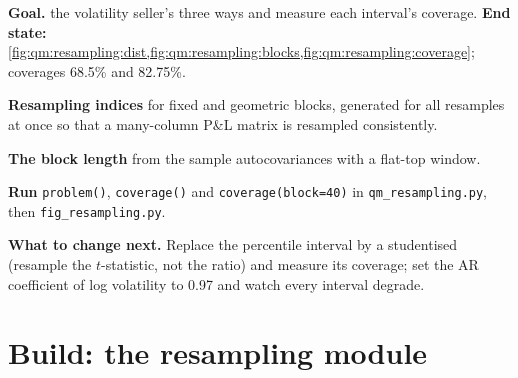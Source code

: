 \begin{tutorial}
\textbf{Goal.}  the volatility seller's  three ways and measure each interval's coverage.
\textbf{End state:} \cref{fig:qm:resampling:dist,fig:qm:resampling:blocks,fig:qm:resampling:coverage}; coverages 68.5\% and 82.75\%.
\begin{tutsteps}
\item \textbf{Resampling indices} for fixed and geometric blocks, generated for all resamples at once so that a many-column P\&L matrix
is resampled consistently.
\label{lst:qm:resampling:indices}
\item \textbf{The block length} from the sample autocovariances with a flat-top window.
\label{lst:qm:resampling:block}
\item \textbf{Run} \texttt{problem()}, \texttt{coverage()} and \texttt{coverage(block=40)} in \texttt{qm\_resampling.py}, then
\texttt{fig\_resampling.py}.
\end{tutsteps}
\textbf{What to change next.} Replace the percentile interval by a studentised  (resample the $t$-statistic, not the ratio) and
measure its coverage; set the AR coefficient of log volatility to 0.97 and watch every interval degrade.
\end{tutorial}

\section{Build: the resampling module}\label{bld:qm:resampling:resample}

